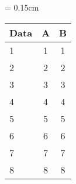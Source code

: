 \documentclass[multi=tabular]{standalone}
\begin{document}
 \renewcommand{\arraystretch}{1.5}
{\tabcolsep = 0.15cm
  \begin{tabular}{lcc}
   \hline\hline
     Data   & A & B \\ \hline
     1      & 1 & 1 \\ 
     2      & 2 & 2 \\ 
     3      & 3 & 3 \\ 
     4      & 4 & 4 \\ 
     5      & 5 & 5 \\ 
     6      & 6 & 6 \\ 
     7      & 7 & 7 \\
     8      & 8 & 8 \\ 
     \hline\hline 
  \end{tabular}
}
\renewcommand{\arraystretch}{1.0}
\end{document}

